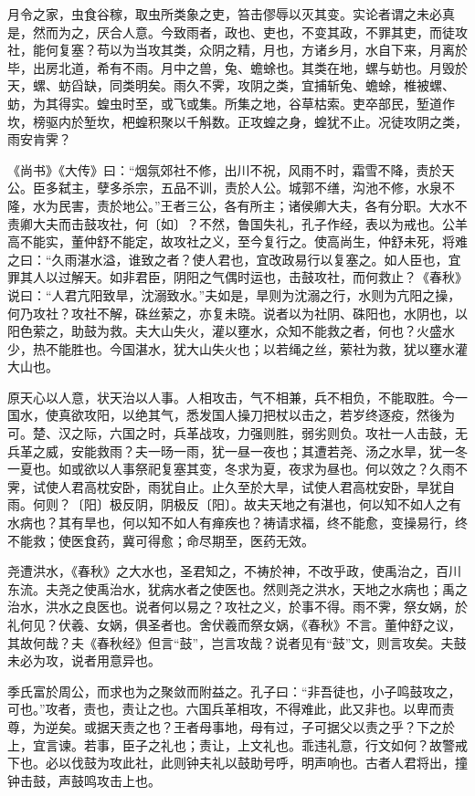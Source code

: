 \documentclass[]{article}
\begin{document}
月令之家，虫食谷稼，取虫所类象之吏，笞击僇辱以灭其变。实论者谓之未必真是，然而为之，厌合人意。今致雨者，政也、吏也，不变其政，不罪其吏，而徒攻社，能何复塞？苟以为当攻其类，众阴之精，月也，方诸乡月，水自下来，月离於毕，出房北道，希有不雨。月中之兽，兔、蟾蜍也。其类在地，螺与蚄也。月毁於天，螺、蚄舀缺，同类明矣。雨久不霁，攻阴之类，宜捕斩兔、蟾蜍，椎被螺、蚄，为其得实。蝗虫时至，或飞或集。所集之地，谷草枯索。吏卒部民，堑道作坎，榜驱内於堑坎，杷蝗积聚以千斛数。正攻蝗之身，蝗犹不止。况徒攻阴之类，雨安肯霁？

《尚书》《大传》曰：``烟氛郊社不修，出川不祝，风雨不时，霜雪不降，责於天公。臣多弑主，孽多杀宗，五品不训，责於人公。城郭不缮，沟池不修，水泉不隆，水为民害，责於地公。''王者三公，各有所主；诸侯卿大夫，各有分职。大水不责卿大夫而击鼓攻社，何〔如〕？不然，鲁国失礼，孔子作经，表以为戒也。公羊高不能实，董仲舒不能定，故攻社之义，至今复行之。使高尚生，仲舒未死，将难之曰：``久雨湛水溢，谁致之者？使人君也，宜改政易行以复塞之。如人臣也，宜罪其人以过解天。如非君臣，阴阳之气偶时运也，击鼓攻社，而何救止？《春秋》说曰：``人君亢阳致旱，沈溺致水。''夫如是，旱则为沈溺之行，水则为亢阳之操，何乃攻社？攻社不解，硃丝萦之，亦复未晓。说者以为社阴、硃阳也，水阴也，以阳色萦之，助鼓为救。夫大山失火，灌以壅水，众知不能救之者，何也？火盛水少，热不能胜也。今国湛水，犹大山失火也；以若绳之丝，萦社为救，犹以壅水灌大山也。

原天心以人意，状天治以人事。人相攻击，气不相兼，兵不相负，不能取胜。今一国水，使真欲攻阳，以绝其气，悉发国人操刀把杖以击之，若岁终逐疫，然後为可。楚、汉之际，六国之时，兵革战攻，力强则胜，弱劣则负。攻社一人击鼓，无兵革之威，安能救雨？夫一旸一雨，犹一昼一夜也；其遭若尧、汤之水旱，犹一冬一夏也。如或欲以人事祭祀复塞其变，冬求为夏，夜求为昼也。何以效之？久雨不霁，试使人君高枕安卧，雨犹自止。止久至於大旱，试使人君高枕安卧，旱犹自雨。何则？〔阳〕极反阴，阴极反〔阳〕。故夫天地之有湛也，何以知不如人之有水病也？其有旱也，何以知不如人有瘅疾也？祷请求福，终不能愈，变操易行，终不能救；使医食药，冀可得愈；命尽期至，医药无效。

尧遭洪水，《春秋》之大水也，圣君知之，不祷於神，不改乎政，使禹治之，百川东流。夫尧之使禹治水，犹病水者之使医也。然则尧之洪水，天地之水病也；禹之治水，洪水之良医也。说者何以易之？攻社之义，於事不得。雨不霁，祭女娲，於礼何见？伏羲、女娲，俱圣者也。舍伏羲而祭女娲，《春秋》不言。董仲舒之议，其故何哉？夫《春秋经》但言``鼓''，岂言攻哉？说者见有``鼓''文，则言攻矣。夫鼓未必为攻，说者用意异也。

季氏富於周公，而求也为之聚敛而附益之。孔子曰：``非吾徒也，小子鸣鼓攻之，可也。''攻者，责也，责让之也。六国兵革相攻，不得难此，此又非也。以卑而责尊，为逆矣。或据天责之也？王者母事地，母有过，子可据父以责之乎？下之於上，宜言谏。若事，臣子之礼也；责让，上文礼也。乖违礼意，行文如何？故警戒下也。必以伐鼓为攻此社，此则钟夫礼以鼓助号呼，明声响也。古者人君将出，撞钟击鼓，声鼓鸣攻击上也。
\end{document}

